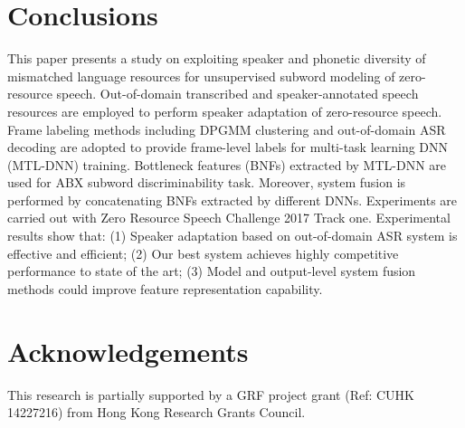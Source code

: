 \documentclass[a4paper]{article}
\begin{document}
\section{Conclusions}
This paper presents a study on exploiting speaker and phonetic diversity of mismatched language resources for unsupervised subword modeling of zero-resource speech. Out-of-domain transcribed and speaker-annotated speech resources are employed to perform speaker adaptation of zero-resource speech. Frame labeling methods including DPGMM clustering and out-of-domain ASR decoding are adopted to provide frame-level labels for multi-task learning DNN (MTL-DNN) training. Bottleneck features (BNFs) extracted by MTL-DNN are used for ABX subword discriminability task. Moreover, system fusion is performed by concatenating BNFs extracted by different  DNNs.
Experiments are carried out with Zero Resource Speech Challenge 2017 Track one. Experimental results show that: (1) Speaker adaptation based on out-of-domain ASR system is effective and efficient; (2) Our best system achieves highly competitive performance to state of the art; (3) Model and output-level system fusion methods could improve feature representation capability. 


\section{Acknowledgements}
This research is partially supported by a GRF project grant (Ref: CUHK 14227216) from Hong Kong Research Grants Council.



\end{document}
